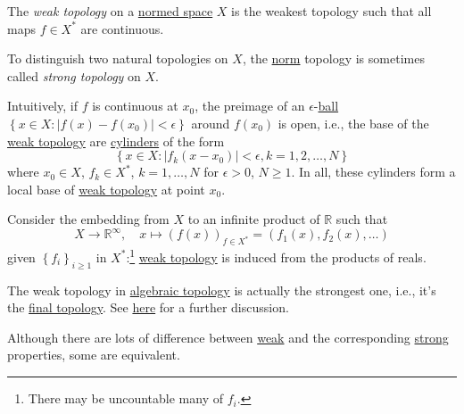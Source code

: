 \begin{definition}\label{def:weak-topology}
	The \emph{weak topology} on a \hyperref[def:normed-vector-space]{normed space} \(X\) is the weakest topology such that all maps \(f\in X^{\ast} \) are continuous.
\end{definition}

\begin{note}\label{note:strong-topology}
	To distinguish two natural topologies on \(X\), the \hyperref[def:norm]{norm} topology is sometimes called \emph{strong topology} on \(X\).
\end{note}

Intuitively, if \(f\) is continuous at \(x_0\), the preimage of an \(\epsilon \)-\hyperref[def:ball]{ball} \(\left\{ x\in X\colon \left\vert f(x) - f(x_0) \right\vert < \epsilon  \right\}\) around \(f(x_0)\) is open, i.e., the base of the \hyperref[def:weak-topology]{weak topology} are \href{https://en.wikipedia.org/wiki/Cylinder_set}{cylinders} of the form
\[
	\left\{ x\in X\colon \left\vert f_k(x - x_0) \right\vert < \epsilon , k = 1, 2, \ldots , N \right\}
\]
where \(x_0\in X\), \(f_k\in X^{\ast} \), \(k = 1, \ldots  , N\) for \(\epsilon > 0\), \(N \geq 1\). In all, these cylinders form a local base of \hyperref[def:weak-topology]{weak topology} at point \(x_0\).

\begin{remark}
	Consider the embedding from \(X\) to an infinite product of \(\mathbb{R} \) such that
	\[
		X\to \mathbb{R} ^{\infty} ,
		\quad x\mapsto (f(x))_{f\in X^{\ast}} = (f_1(x), f_2(x), \ldots )
	\]
	given \(\left\{ f_i \right\} _{i \geq 1}\) in \(X^{\ast}\):\footnote{There may be uncountable many of \(f_i\).} \hyperref[def:weak-topology]{weak topology} is induced from the products of reals.
\end{remark}

\begin{note}
	The weak topology in \href{https://www.pbb.wtf/posts/Notes#algebraic-topology-math592-umich}{algebraic topology} is actually the strongest one, i.e., it's the \href{https://en.wikipedia.org/wiki/Final_topology}{final topology}. See \href{https://math.stackexchange.com/questions/921744/any-relations-between-the-weak-topology-on-a-banach-space-and-the-weak-topology}{here} for a further discussion.
\end{note}

Although there are lots of difference between \hyperref[def:weak-topology]{weak} and the corresponding \hyperref[note:strong-topology]{strong} properties, some are equivalent.

